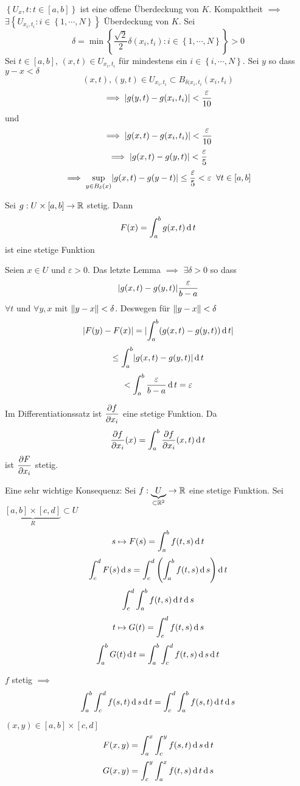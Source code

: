 \begin{Bew}
  $\left\{ U_x,t:t\in [a,b] \right\}$ ist eine offene Überdeckung von $K$. Kompaktheit $\implies$ $\exists \left\{ U_{x_i,t_i}:i\in \left\{ 1,\cdots,N \right\} \right\}$ Überdeckung von $K$. Sei 
  \[\delta=\min\left\{ \frac{\sqrt{2}}{2}\delta(x_i,t_i):i\in\left\{ 1,\cdots,N \right\} \right\}>0\]
  Sei $t\in [a,b]$, $(x,t)\in U_{x_i,t_i}$ für mindestens ein $i\in \left\{ i,\cdots,N \right\}$. Sei $y$ so dass $y-x<\delta$
  \[(x,t),(y,t)\in U_{x_i,t_i}\subset B_{\delta(x_i,t_i}(x_i,t_i)\]
  \[\implies \mathopen| g(y,t)-g(x_i,t_i) \mathclose|<\frac{\varepsilon}{10}\]
  und
  \[\implies \mathopen| g(x,t)-g(x_i,t_i) \mathclose|<\frac{\varepsilon}{10}\]
  \[\implies \mathopen| g(x,t)-g(y,t) \mathclose|<\frac{\varepsilon}{5}\]
  \[\implies \sup_{y\in B_\delta(x)}\mathopen| g(x,t)-g(y-t) \mathclose|\leq\frac{\varepsilon}{5}<\varepsilon\hspace{2mm}\forall t\in [a,b]\]
\end{Bew}
\begin{Kor}
  Sei $g:U\times [a,b]\rightarrow\mathbb{R}$ stetig. Dann
  \[F(x)=\int_a^bg(x,t)\operatorname{d} t\]
  ist eine stetige Funktion
\end{Kor}
\begin{Bew}
  Seien $x\in U$ und $\varepsilon >0$. Das letzte Lemma $\implies$ $\exists \delta >0$ so dass
  \[\mathopen| g(x,t)-g(y,t) \mathclose|\frac{\varepsilon}{b-a}\]
  $\forall t$ und $\forall y,x$ mit $\left\| y-x \right\|<\delta$. Deswegen für $\left\| y-x \right\|<\delta$
  \[\mathopen| F(y)-F(x) \mathclose|=\mathopen| \int_a^b(g(x,t)-g(y,t))\operatorname{d} t \mathclose|\]
  \[\leq\int_a^b\mathopen| g(x,t)-g(y,t) \mathclose|\operatorname{d} t\]
  \[<\int_a^b\frac{\varepsilon}{b-a}\operatorname{d} t=\varepsilon\]
\end{Bew}
\begin{Bem}
  Im Differentiationssatz ist $\dfrac{\partial f}{\partial x_i}$ eine stetige Funktion. Da
  \[\dfrac{\partial f}{\partial x_i}(x)=\int_a^b\dfrac{\partial f}{\partial x_i}(x,t)\operatorname{d} t\]
  ist $\dfrac{\partial F}{\partial x_i}$ stetig.
\end{Bem}
\begin{Bem}
  Eine sehr wichtige Konsequenz: Sei $f:\underbrace{U}_{\subset\mathbb{R}^2}\rightarrow \mathbb{R}$ eine stetige Funktion. Sei $\underbrace{[a,b]\times [c,d]}_R\subset U$
  \[s\mapsto F(s)=\int_a^b f(t,s)\operatorname{d} t\]
  \[\int_c^dF(s)\operatorname{d} s=\int_c^d\left( \int_a^bf(t,s)\operatorname{d} s \right)\operatorname{d} t\]
  \[\int_c^d\int_a^bf(t,s)\operatorname{d} t\operatorname{d} s\]
  \[t\mapsto G(t)=\int_c^df(t,s)\operatorname{d} s\]
  \[\int_a^bG(t)\operatorname{d} t=\int_a^b\int _c^df(t,s)\operatorname{d} s\operatorname{d} t\]
\end{Bem}
\begin{Sat}
  $f$ stetig $\implies$
  \[\int_a^b\int_c^df(s,t)\operatorname{d} s\operatorname{d} t=\int_c^d\int_a^b f(s,t)\operatorname{d} t\operatorname{d} s\]
\end{Sat}
\begin{Bew}
  $(x,y)\in [a,b]\times [c,d]$
  \[F(x,y)=\int_a^x\int_c^yf(s,t)\operatorname{d} s\operatorname{d} t\]
  \[G(x,y)=\int_c^y\int_a^x f(t,s)\operatorname{d} t\operatorname{d} s\]
\end{Bew}
